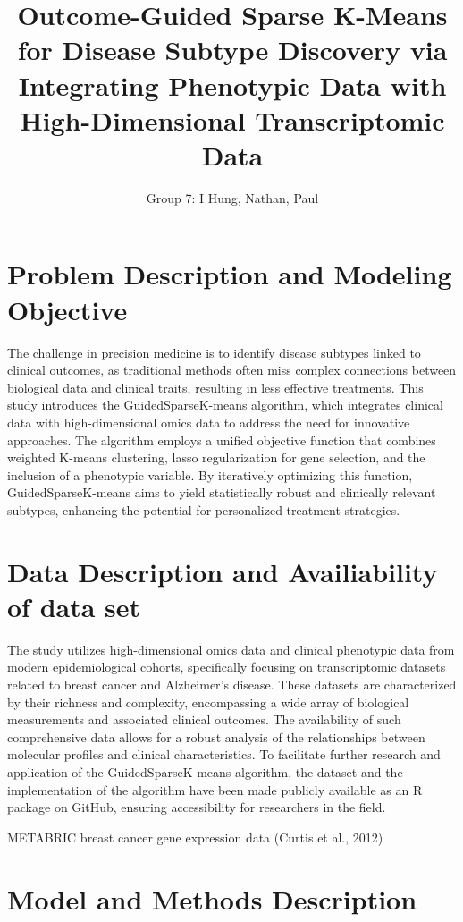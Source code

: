 \documentclass{statsoc}
\title[GuidedSparseKmeans]{Outcome-Guided Sparse K-Means for Disease Subtype Discovery via Integrating Phenotypic Data with High-Dimensional Transcriptomic Data}
\author[]{Group 7: I Hung, Nathan, Paul}
\begin{document}
\section{Problem Description and Modeling Objective}

The challenge in precision medicine is to identify disease subtypes linked to clinical outcomes, as traditional methods often miss complex connections between biological data and clinical traits, resulting in less effective treatments. This study introduces the GuidedSparseK-means algorithm, which integrates clinical data with high-dimensional omics data to address the need for innovative approaches. The algorithm employs a unified objective function that combines weighted K-means clustering, lasso regularization for gene selection, and the inclusion of a phenotypic variable. By iteratively optimizing this function, GuidedSparseK-means aims to yield statistically robust and clinically relevant subtypes, enhancing the potential for personalized treatment strategies.

\section{Data Description and Availiability of data set}

The study utilizes high-dimensional omics data and clinical phenotypic data from modern epidemiological cohorts, specifically focusing on transcriptomic datasets related to breast cancer and Alzheimer’s disease. These datasets are characterized by their richness and complexity, encompassing a wide array of biological measurements and associated clinical outcomes. The availability of such comprehensive data allows for a robust analysis of the relationships between molecular profiles and clinical characteristics. To facilitate further research and application of the GuidedSparseK-means algorithm, the dataset and the implementation of the algorithm have been made publicly available as an R package on GitHub, ensuring accessibility for researchers in the field.

METABRIC breast cancer gene expression data (Curtis et al., 2012)

\section{Model and Methods Description}
\end{document}
